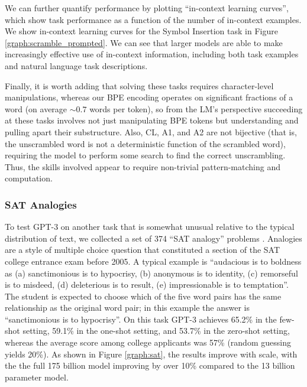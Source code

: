 We can further quantify performance by plotting ``in-context learning curves'', which show task performance as a function of the number of in-context examples.  We show in-context learning curves for the Symbol Insertion task in Figure \ref{graph:scramble_prompted}.  We can see that larger models are able to make increasingly effective use of in-context information, including both task examples and natural language task descriptions.

Finally, it is worth adding that solving these tasks requires character-level manipulations, whereas our BPE encoding operates on significant fractions of a word (on average $\sim0.7$ words per token), so from the LM’s perspective succeeding at these tasks involves not just manipulating BPE tokens but understanding and pulling apart their substructure. Also, CL, A1, and A2 are not bijective (that is, the unscrambled word is not a deterministic function of the scrambled word), requiring the model to perform some search to find the correct unscrambling. Thus, the skills involved appear to require non-trivial pattern-matching and computation.

        \subsubsection{SAT Analogies}
        \label{section:SAT_Analogies}

To test GPT-3 on another task that is somewhat unusual relative to the typical distribution of text, we collected a set of 374 ``SAT analogy'' problems \cite{DBLP:journals/corr/cs-CL-0309035}.  Analogies are a style of multiple choice question that constituted a section of the SAT college entrance exam before 2005.  A typical example is ``audacious is to boldness as (a) sanctimonious is to hypocrisy, (b) anonymous is to identity, (c) remorseful is to misdeed, (d) deleterious is to result, (e) impressionable is to temptation''.  The student is expected to choose which of the five word pairs has the same relationship as the original word pair; in this example the answer is ``sanctimonious is to hypocrisy''.  On this task GPT-3 achieves 65.2\% in the few-shot setting, 59.1\% in the one-shot setting, and 53.7\% in the zero-shot setting, whereas the average score among college applicants was 57\% \cite{DBLP:journals/corr/abs-cs-0508103}  (random guessing yields 20\%).  As shown in Figure \ref{graph:sat}, the results improve with scale, with the the full 175 billion model improving by over 10\% compared to the 13 billion parameter model.

